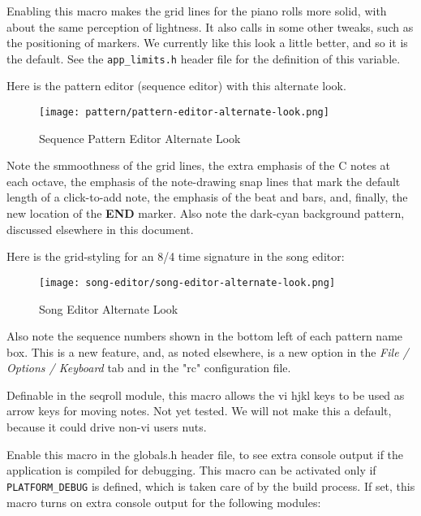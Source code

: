         Enabling this macro makes the grid lines for the piano rolls
        more solid, with about the same perception of lightness.
        It also calls in some other tweaks, such as the positioning of
        markers.  We currently like this look a little better, and so it is
        the default.  See the \texttt{app\_limits.h}
        header file for the definition of this variable.

        Here is the pattern editor (sequence editor) with this alternate look.

\begin{figure}[H]
   \centering 
   \texttt{[image: pattern/pattern-editor-alternate-look.png]}
   \caption{Sequence Pattern Editor Alternate Look}
   \label{fig:seq64_pattern_editor_alternate_look}
\end{figure}

        Note the smmoothness of the grid lines, the extra emphasis of the C
        notes at each octave, the emphasis of the note-drawing snap lines that
        mark the default length of a click-to-add note, the emphasis of the
        beat and bars, and, finally, the new location of the
        \textbf{END} marker.  Also note the dark-cyan background pattern,
        discussed elsewhere in this document.

        Here is the grid-styling for an 8/4 time signature in the song editor:

\begin{figure}[H]
   \centering 
   \texttt{[image: song-editor/song-editor-alternate-look.png]}
   \caption{Song Editor Alternate Look}
   \label{fig:seq64_song_editor_alternate_look}
\end{figure}

      Also note the sequence numbers shown in the bottom left of each pattern
      name box. This is a new feature, and, as noted elsewhere, is a new
      option in the \textsl{File / Options / Keyboard} tab and in
      the "rc" configuration file.

        Definable in the seqroll module, this macro allows the vi hjkl keys to
        be used as arrow keys for moving notes.  Not yet tested.  We will not
        make this a default, because it could drive non-vi users nuts.

        Enable this macro in the globals.h header file, to see extra console
        output if the application is compiled for debugging.  This macro can be
        activated only if \texttt{PLATFORM\_DEBUG} is defined, which is taken
        care of by the build process.  If set, this macro turns on extra
        console output for the following modules:

